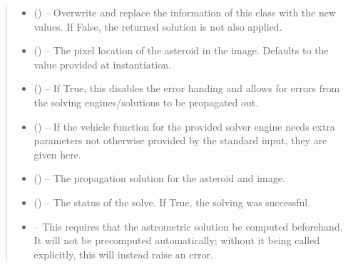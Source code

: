 \documentclass[letterpaper,11pt,english]{sphinxmanual}
\begin{document}
\begin{savenotes}
\begin{fulllineitems}
\begin{savenotes}
\begin{fulllineitems}
\begin{quote}
\begin{description}
\begin{itemize}
\item {} 
\sphinxAtStartPar
{} (\sphinxstyleliteralemphasis{\sphinxupquote{, }}) – Overwrite and replace the information of this class with the new
values. If False, the returned solution is not also applied.

\item {} 
\sphinxAtStartPar
{} (\sphinxstyleliteralemphasis{\sphinxupquote{, }}) – The pixel location of the asteroid in the image. Defaults to the
value provided at instantiation.

\item {} 
\sphinxAtStartPar
{} (\sphinxstyleliteralemphasis{\sphinxupquote{, }}) – If True, this disables the error handing and allows for errors from
the solving engines/solutions to be propagated out.

\item {} 
\sphinxAtStartPar
{} (\sphinxstyleliteralemphasis{\sphinxupquote{, }}) – If the vehicle function for the provided solver engine needs
extra parameters not otherwise provided by the standard input,
they are given here.

\end{itemize}

\sphinxAtStartPar
\begin{itemize}
\item {} 
\sphinxAtStartPar
{} () – The propagation solution for the asteroid and image.

\item {} 
\sphinxAtStartPar
{} () – The status of the solve. If True, the solving was successful.

\item {} 
\sphinxAtStartPar
{} – This requires that the astrometric solution be computed
before\sphinxhyphen{}hand. It will not be precomputed automatically; without it
being called explicitly, this will instead raise an error.


\end{itemize}
\end{description}
\end{quote}
\end{fulllineitems}
\end{savenotes}
\end{fulllineitems}
\end{savenotes}
\end{document}
